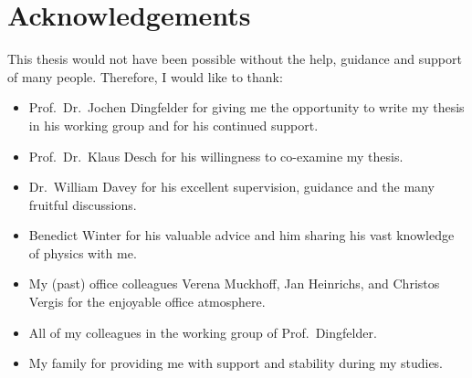 \chapter{Acknowledgements}
\label{sec:ack}

This thesis would not have been possible without the help, guidance and support
of many people. Therefore, I would like to thank:
\begin{itemize}
\item Prof.\ Dr.\ Jochen Dingfelder for giving me the opportunity to write my
  thesis in his working group and for his continued support.

\item Prof.\ Dr.\ Klaus Desch for his willingness to co-examine my thesis.

\item Dr.\ William Davey for his excellent supervision, guidance and the many
  fruitful discussions.

\item Benedict Winter for his valuable advice and him sharing his vast knowledge
  of physics with me.

\item My (past) office colleagues Verena Muckhoff, Jan Heinrichs, and Christos
  Vergis for the enjoyable office atmosphere.

\item All of my colleagues in the working group of Prof.\ Dingfelder.

\item My family for providing me with support and stability during my studies.

\end{itemize}




